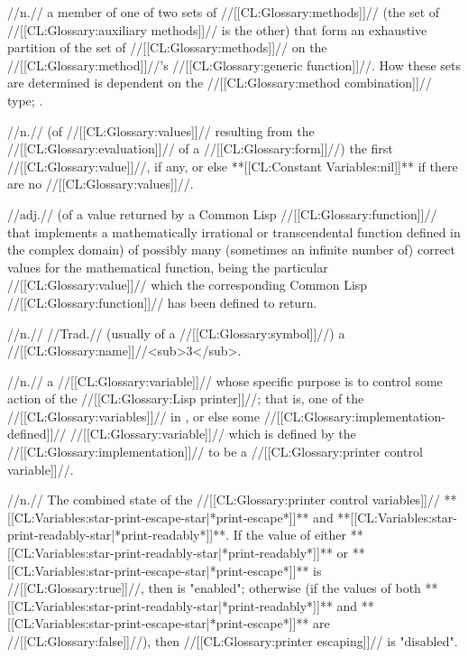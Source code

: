  //n.// a member of one of two sets of //[[CL:Glossary:methods]]// (the set of //[[CL:Glossary:auxiliary methods]]// is the other) that form an exhaustive partition of the set of //[[CL:Glossary:methods]]// on the //[[CL:Glossary:method]]//'s //[[CL:Glossary:generic function]]//. How these sets are determined is dependent on the //[[CL:Glossary:method combination]]// type; \seesection\IntroToMethods.

 //n.// (of //[[CL:Glossary:values]]// resulting from the //[[CL:Glossary:evaluation]]// of a //[[CL:Glossary:form]]//) the first //[[CL:Glossary:value]]//, if any, or else **[[CL:Constant Variables:nil]]** if there are no //[[CL:Glossary:values]]//. 

 //adj.// (of a value returned by a Common Lisp //[[CL:Glossary:function]]// that implements a mathematically irrational or transcendental function defined in the complex domain) of possibly many (sometimes an infinite number of) correct values for the mathematical function, being the particular //[[CL:Glossary:value]]// which the corresponding Common Lisp //[[CL:Glossary:function]]// has been defined to return.

 //n.// //Trad.// (usually of a //[[CL:Glossary:symbol]]//) a //[[CL:Glossary:name]]//<sub>3</sub>.

 //n.// a //[[CL:Glossary:variable]]// whose specific purpose is to control some action of the //[[CL:Glossary:Lisp printer]]//; that is, one of the //[[CL:Glossary:variables]]// in \figref\StdPrinterControlVars, or else some //[[CL:Glossary:implementation-defined]]// //[[CL:Glossary:variable]]// which is defined by the //[[CL:Glossary:implementation]]// to be a //[[CL:Glossary:printer control variable]]//.

 //n.// The combined state of the //[[CL:Glossary:printer control variables]]// **[[CL:Variables:star-print-escape-star|*print-escape*]]** and **[[CL:Variables:star-print-readably-star|*print-readably*]]**. If the value of either **[[CL:Variables:star-print-readably-star|*print-readably*]]** or **[[CL:Variables:star-print-escape-star|*print-escape*]]** is //[[CL:Glossary:true]]//, then  is "enabled"; otherwise (if the values of both **[[CL:Variables:star-print-readably-star|*print-readably*]]** and **[[CL:Variables:star-print-escape-star|*print-escape*]]** are //[[CL:Glossary:false]]//), then //[[CL:Glossary:printer escaping]]// is "disabled".


